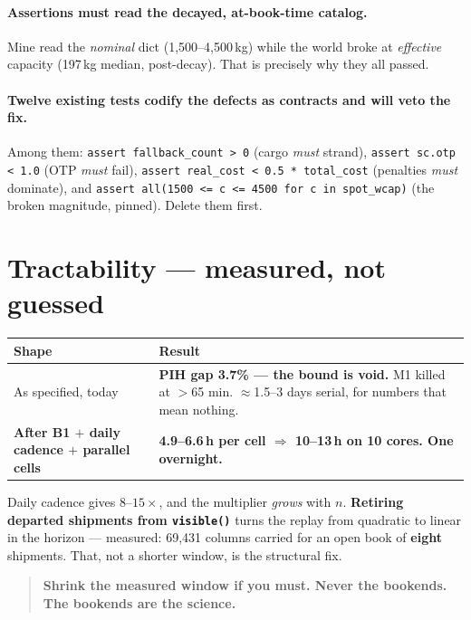\documentclass[11pt,a4paper]{article}
\newcommand{\src}[1]{\texttt{\small #1}}
\begin{document}
\paragraph{Assertions must read the decayed, at-book-time catalog.} Mine read the \emph{nominal} dict
(1{,}500--4{,}500\,kg) while the world broke at \emph{effective} capacity (197\,kg median, post-decay).
That is precisely why they all passed.

\paragraph{Twelve existing tests codify the defects as contracts and will veto the fix.} Among them:
\src{assert fallback\_count > 0} (cargo \emph{must} strand), \src{assert sc.otp < 1.0} (OTP \emph{must}
fail), \src{assert real\_cost < 0.5 * total\_cost} (penalties \emph{must} dominate), and
\src{assert all(1500 <= c <= 4500 for c in spot\_wcap)} (the broken magnitude, pinned). Delete them first.

\section{Tractability --- measured, not guessed}

\begin{center}
\begin{tabularx}{\textwidth}{@{}lL@{}}
\toprule
\textbf{Shape} & \textbf{Result} \\
\midrule
As specified, today & \textbf{PIH gap 3.7\% --- the bound is void.} M1 killed at $>$65 min.
$\approx$1.5--3 days serial, for numbers that mean nothing. \\
\textbf{After B1 $+$ daily cadence $+$ parallel cells} & \textbf{4.9--6.6\,h per cell $\Rightarrow$
10--13\,h on 10 cores. One overnight.} \\
\bottomrule
\end{tabularx}
\end{center}

Daily cadence gives $8$--$15\times$, and the multiplier \emph{grows} with $n$. \textbf{Retiring departed
shipments from \src{visible()}} turns the replay from quadratic to linear in the horizon --- measured:
69{,}431 columns carried for an open book of \textbf{eight} shipments. That, not a shorter window, is the
structural fix.

\begin{quote}
\textbf{Shrink the measured window if you must. Never the bookends. The bookends are the science.}
\end{quote}
\end{document}
